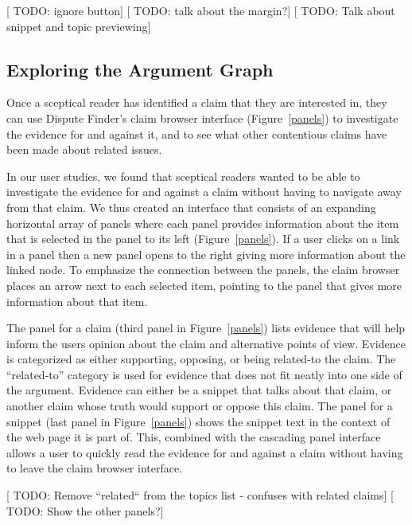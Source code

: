 \documentclass{www2010-submission}
\newcommand{\todo}[1]{{[\color{blue} TODO: #1]}}
\begin{document}
\todo{ignore button}
\todo{talk about the margin?}
\todo{Talk about snippet and topic previewing}

\subsection{Exploring the Argument Graph}

Once a sceptical reader has identified a claim that they are interested in, they can use Dispute Finder's claim browser interface (Figure~\ref{panels}) to investigate the evidence for and against it, and to see what other contentious claims have been made about related issues. 

In our user studies, we found that sceptical readers wanted to be able to investigate the evidence for and against a claim without having to navigate away from that claim. We thus created an interface that consists of an expanding horizontal array of panels where each panel provides information about the item that is selected in the panel to its left (Figure~\ref{panels}). If a user clicks on a link in a panel then a new panel opens to the right giving more information about the linked node. To emphasize the connection between the panels, the claim browser places an arrow next to each selected item, pointing to the panel that gives more information about that item.

The panel for a claim (third panel in Figure~\ref{panels}) lists evidence that will help inform the users opinion about the claim and alternative points of view. Evidence is categorized as either supporting, opposing, or being related-to the claim. The ``related-to'' category is used for evidence that does not fit neatly into one side of the argument. Evidence can either be a snippet that talks about that claim, or another claim whose truth would support or oppose this claim.  The panel for a snippet (last panel in Figure~\ref{panels}) shows the snippet text in the context of the web page it is part of. This, combined with the cascading panel interface allows a user to quickly read the evidence for and against a claim without having to leave the claim browser interface.

\todo{Remove ``related`` from the topics list - confuses with related claims}
\todo{Show the other panels?}

\end{document}
